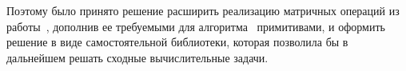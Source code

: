 Поэтому было принято решение расширить реализацию матричных операций из работы~\cite{inproceedings:cfqp_matrix_with_single_source}, дополнив ее требуемыми для алгоритма~\cite{inbook:kronecker_cfpq_adbis} примитивами, и оформить решение в виде самостоятельной библиотеки, которая позволила бы в дальнейшем решать сходные вычислительные задачи.
